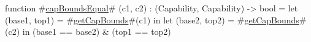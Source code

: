 function #\hyperref[sailMIPSzcapBoundsEqual]{capBoundsEqual}# (c1, c2) : (Capability, Capability) -> bool =
    let (base1, top1) = #\hyperref[sailMIPSzgetCapBounds]{getCapBounds}#(c1) in
    let (base2, top2) = #\hyperref[sailMIPSzgetCapBounds]{getCapBounds}#(c2) in
    (base1 == base2) & (top1 == top2)
